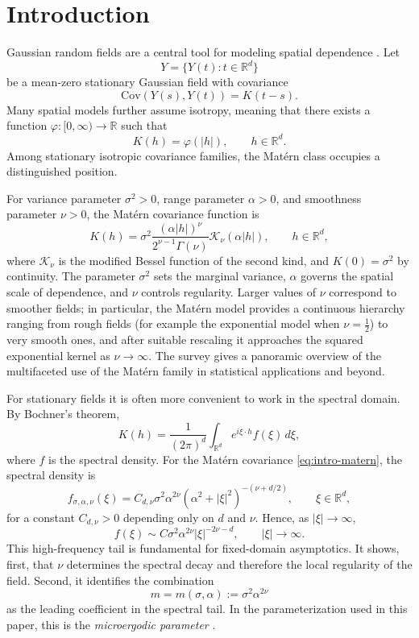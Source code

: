 \documentclass[11pt, reqno]{amsart}
\theoremstyle{remark}
\newcommand{\R}{\mathbb{R}}
\newcommand{\1}{\mathbf{1}}
\begin{document}
\section{Introduction}

Gaussian random fields are a central tool for modeling spatial dependence
\cite{stein1999,banerjee2003}.
Let
\[
Y=\{Y(t):t\in\R^d\}
\]
be a mean-zero stationary Gaussian field with covariance
\[
\mathrm{Cov}(Y(s),Y(t)) = K(t-s).
\]
Many spatial models further assume isotropy, meaning that
there exists a function
$\varphi:[0,\infty)\to\R$ such that
\[
K(h) = \varphi(|h|), \qquad h\in\R^d .
\]
Among stationary isotropic covariance families, the Mat\'ern class occupies a distinguished position.

For variance parameter $\sigma^2>0$, range parameter $\alpha>0$, and
smoothness parameter $\nu>0$, the Mat\'ern covariance function is \cite{stein1999}
\begin{equation}\label{eq:intro-matern}
K(h)=
\sigma^2
\frac{(\alpha |h|)^\nu}{2^{\nu-1}\Gamma(\nu)}
\mathcal{K}_\nu(\alpha |h|),
\qquad h\in\R^d,
\end{equation}
where $\mathcal{K}_\nu$ is the modified Bessel function of the second kind,
and $K(0)=\sigma^2$ by continuity.
The parameter $\sigma^2$ sets the marginal variance, $\alpha$ governs the
spatial scale of dependence, and $\nu$ controls regularity.
Larger values of $\nu$ correspond to smoother fields; in particular, the
Mat\'ern model provides a continuous hierarchy ranging from rough fields
(for example the exponential model when $\nu=\tfrac12$) to very smooth
ones, and after suitable rescaling it approaches the squared exponential
kernel as $\nu\to\infty$. The survey \cite{porcu2024matern} gives a  panoramic overview of the multifaceted use of the Mat\'ern family in statistical
applications and  beyond. 

For stationary fields it is often more convenient to work in the spectral
domain.
By Bochner's theorem,
\[
K(h)=\frac{1}{(2\pi)^d}\int_{\R^d} e^{i\xi\cdot h}f(\xi)\,d\xi,
\]
where $f$ is the spectral density.
For the Mat\'ern covariance \eqref{eq:intro-matern}, the spectral density is \cite[p. 49]{stein1999}
\begin{equation}\label{eq:intro-spectral}
f_{\sigma,\alpha,\nu}(\xi)
=
C_{d,\nu}\sigma^2\alpha^{2\nu}
(\alpha^2+|\xi|^2)^{-(\nu+d/2)},
\qquad \xi\in\R^d,
\end{equation}
for a constant $C_{d,\nu}>0$ depending only on $d$ and $\nu$.
Hence, as $|\xi|\to\infty$,
\begin{equation}\label{eqn:highfreq}
f(\xi)\sim C\sigma^2\alpha^{2\nu}|\xi|^{-2\nu-d},
\qquad |\xi|\to\infty.
\end{equation}
This high-frequency tail is fundamental for fixed-domain asymptotics.
It shows, first, that $\nu$ determines the spectral decay and therefore the
local regularity of the field.
Second, it identifies the combination
\begin{equation} \label{eqn:microerg}
m = m(\sigma,\alpha):=\sigma^2\alpha^{2\nu}
\end{equation}
as the leading coefficient in the spectral tail.
In the parameterization used in this paper, this is the
\emph{microergodic parameter} \cite{stein1999}.
\end{document}
